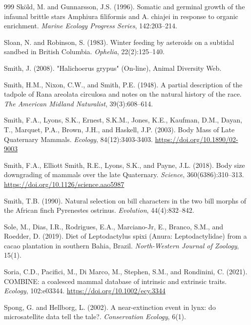 \begin{thebibliography}{999}
Sk{\"o}ld, M. and Gunnarsson, J.S. (1996). Somatic and germinal growth of the infaunal brittle stars Amphiura filiformis and A. chiajei in response to organic enrichment. \textit{Marine Ecology Progress Series}, 142:203--214.

Sloan, N. and Robinson, S. (1983). Winter feeding by asteroids on a subtidal sandbed in British Columbia. \textit{Ophelia}, 22(2):125--140.

Smith, J. (2008). "Halichoerus grypus" (On-line), {Animal Diversity Web}.

Smith, H.M., Nixon, C.W., and Smith, P.E. (1948). A partial description of the tadpole of Rana areolata circulosa and notes on the natural history of the race. \textit{The American Midland Naturalist}, 39(3):608--614.

Smith, F.A., Lyons, S.K., Ernest, S.K.M., Jones, K.E., Kaufman, D.M., Dayan, T., Marquet, P.A., Brown, J.H., and Haskell, J.P. (2003). Body Mass of Late Quaternary Mammals. \textit{Ecology}, 84(12):3403-3403. \url{https://doi.org/10.1890/02-9003}

Smith, F.A., Elliott Smith, R.E., Lyons, S.K., and Payne, J.L. (2018). Body size downgrading of mammals over the late Quaternary. \textit{Science}, 360(6386):310--313. \url{https://doi.org/10.1126/science.aao5987}

Smith, T.B. (1990). Natural selection on bill characters in the two bill morphs of the African finch Pyrenestes ostrinus. \textit{Evolution}, 44(4):832--842.

Sole, M., Dias, I.R., Rodrigues, E.A., Marciano-Jr, E., Branco, S.M., and Roedder, D. (2019). Diet of Leptodactylus spixi (Anura: Leptodactylidae) from a cacao plantation in southern Bahia, Brazil. \textit{North-Western Journal of Zoology}, 15(1).

Soria, C.D., Pacifici, M., Di Marco, M., Stephen, S.M., and Rondinini, C. (2021). {COMBINE}: a coalesced mammal database of intrinsic and extrinsic traits. \textit{Ecology}, 102:e03344. \url{https://doi.org/10.1002/ecy.3344}

Spong, G. and Hellborg, L. (2002). A near-extinction event in lynx: do microsatellite data tell the tale?. \textit{Conservation Ecology}, 6(1).


\end{thebibliography}
